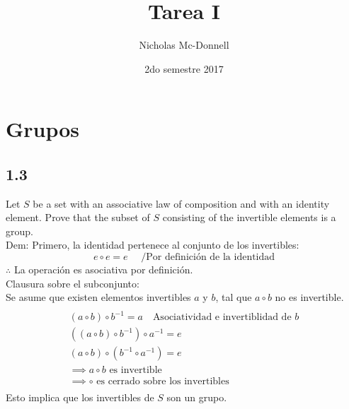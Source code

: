 \documentclass[11pt]{article}
\title{Tarea I}
\author{Nicholas Mc-Donnell}
\date{2do semestre 2017}
\begin{document}
\maketitle
{}

\newpage
\tableofcontents
{}

\newpage
\section{Grupos}
\subsection*{1.3}
Let $S$ be a set with an associative law of composition and with an identity element. Prove that the subset of $S$ consisting of the invertible elements is a group.\\
Dem:
Primero, la identidad pertenece al conjunto de los invertibles:
\[
e \circ e = e \quad \textrm{ /Por definición de la identidad}
\]
$\therefore$ La operación es asociativa por definición.\\
Clausura sobre el subconjunto:\\
Se asume que existen elementos invertibles $a$ y $b$, tal que $a\circ b$ no es invertible.
\begin{multline}
\\
(a\circ b)\circ b^{-1}=a\quad\textrm{Asociatividad e invertiblidad de $b$}\\
\left(\left(a\circ b\right)\circ b^{-1}\right)\circ a^{-1}=e\\
\left(a\circ b\right)\circ\left(b^{-1}\circ a^{-1}\right)=e\\
\implies a\circ b \textrm{ es invertible}\\
\implies \circ \textrm{ es cerrado sobre los invertibles}\\
\end{multline}
Esto implica que los invertibles de $S$ son un grupo.
\end{document}
